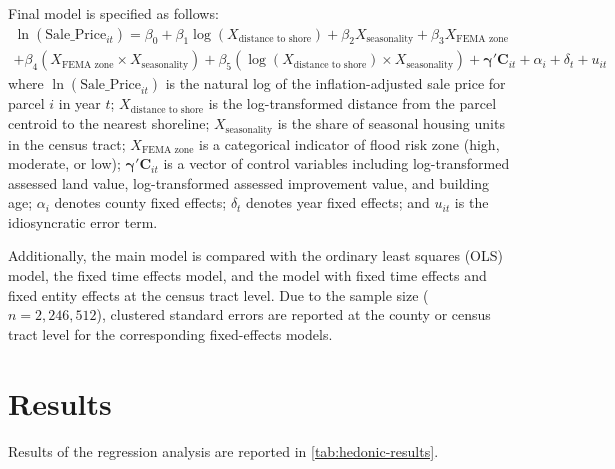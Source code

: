 \documentclass[11pt]{article}
\begin{document}
        Final model is specified as follows: 
        \begin{multline}
            \ln(\text{Sale\_Price}_{it}) = \beta_0 + \beta_1 \log(X_{\text{distance to shore}}) + \beta_2 X_{\text{seasonality}} + \beta_3 X_{\text{FEMA zone}} \\
            + \beta_4 \left(X_{\text{FEMA zone}} \times X_{\text{seasonality}}\right) + \beta_5 \left(\log(X_{\text{distance to shore}}) \times X_{\text{seasonality}}\right) + \boldsymbol{\gamma}' \mathbf{C}_{it} + \alpha_i + \delta_t + u_{it}
        \end{multline}
        \noindent where $\ln(\text{Sale\_Price}_{it})$ is the natural log of the inflation-adjusted sale price for parcel $i$ in year $t$; $X_{\text{distance to shore}}$ is the log-transformed distance from the parcel centroid to the nearest shoreline; $X_{\text{seasonality}}$ is the share of seasonal housing units in the census tract; $X_{\text{FEMA zone}}$ is a categorical indicator of flood risk zone (high, moderate, or low); $\boldsymbol{\gamma}' \mathbf{C}_{it}$ is a vector of control variables including log-transformed assessed land value, log-transformed assessed improvement value, and building age; $\alpha_i$ denotes county fixed effects; $\delta_t$ denotes year fixed effects; and $u_{it}$ is the idiosyncratic error term.

    Additionally, the main model is compared with the ordinary least squares (OLS) model, the fixed time effects model, and the model with fixed time effects and fixed entity effects at the census tract level. Due to the sample size ($n = 2,246,512$), clustered standard errors are reported at the county or census tract level for the corresponding fixed-effects models. 

\section{Results}\label{sec:results}



Results of the regression analysis are reported in \autoref{tab:hedonic-results}.
\end{document}
